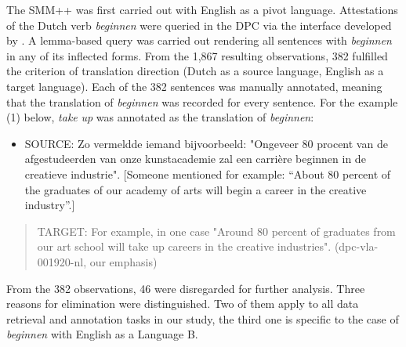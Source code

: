 The SMM++ was first carried out with English as a pivot language. Attestations of the Dutch verb \textit{beginnen} were queried in the DPC via the interface developed by \citet[62]{delaere_translations_2015}. A lemma-based query was carried out rendering all sentences with \textit{beginnen} in any of its inflected forms. From the 1,867 resulting observations, 382 fulfilled the criterion of translation direction (Dutch as a source language, English as a target language). Each of the 382 sentences was manually annotated, meaning that the translation of \textit{beginnen} was recorded for every sentence. For the example (1) below, \textit{take} \textit{up} was annotated as the translation of \textit{beginnen}:

\begin{itemize}
\item \begin{styleVoorbeeld}
SOURCE: Zo vermeldde iemand bijvoorbeeld: "Ongeveer 80 procent van de afgestudeerden van onze kunstacademie zal een carrière beginnen in de creatieve industrie". [Someone mentioned for example: “About 80 percent of the graduates of our academy of arts will begin a career in the creative industry”.]
\end{styleVoorbeeld}\end{itemize}
\begin{quote}
TARGET: For example, in one case "Around 80 percent of graduates from our art school will take up careers in the creative industries". (dpc-vla-001920-nl, our emphasis)
\end{quote}

From the 382 observations, 46 were disregarded for further analysis. Three reasons for elimination were distinguished. Two of them apply to all data retrieval and annotation tasks in our study, the third one is specific to the case of \textit{beginnen} with English as a Language B.

